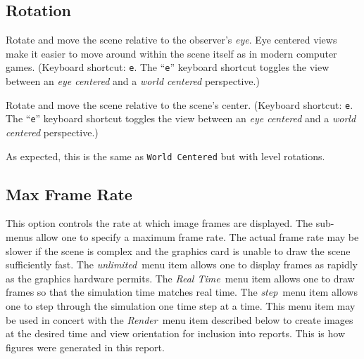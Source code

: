 \documentclass[11pt,twoside]{book}
\newcommand{\parma}{.75}
\newcommand{\parmb}{.5}
\newcommand{\parmc}{0.25}
\newcommand{\blist}{
\begin{list}
{}{
\setlength{\leftmargin}{\parma in}
\setlength{\labelwidth}{\parmb in}
\setlength{\labelsep}{\parmc in}
\setlength{\listparindent}{0.3in}
\setlength{\topsep}{.3in}
\setlength{\parsep}{.0in}
}}
\newcommand{\elist}{\end{list}}
\newcommand{\hitem}[1]{\item[{\bf #1} \hfill]}
\begin{document}
\subsection{Rotation}
\blist

\hitem{Eye Centered}Rotate and move the scene relative to the observer's {\em eye}.
Eye centered views make it easier to move around within the scene itself as in modern
computer games.
(Keyboard shortcut: {\tt e}.
The ``{\tt e}'' keyboard shortcut toggles the view
between an {\em eye centered} and a {\em world centered} perspective.)

\hitem{World Centered}Rotate and move the scene relative to the scene's center.
(Keyboard shortcut: {\tt e}.
The ``{\tt e}'' keyboard shortcut toggles the view
between an {\em eye centered} and a {\em world centered} perspective.)

\hitem{World Centered - Level Rotation}As expected, this is the
same as {\tt World Centered} but with level rotations.

\elist
\subsection{Max Frame Rate}
This option controls the rate at which image frames are displayed.
The sub-menus allow one to specify a maximum frame rate.  The
actual frame rate may be slower if the scene is complex and the
graphics card is unable to draw the scene sufficiently fast. The
{\em unlimited}\ menu item allows one to display frames as rapidly
as the graphics hardware permits.  The {\em Real Time}\ menu item
allows one to draw frames so that the simulation time matches real
time. The {\em step}\ menu item allows one to step through the
simulation one time step at a time. This menu item may be used in
concert with the {\em Render}\ menu item described below to create
images at the desired time and view orientation for inclusion into
reports. This is how figures were generated in this report.
\\
\end{document}
